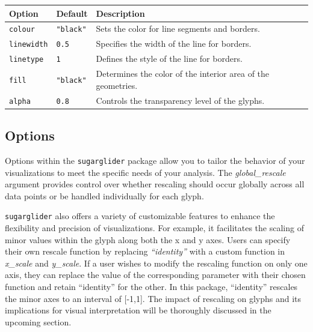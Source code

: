 \begin{longtable}[]{@{}
  >{\raggedright\arraybackslash}p{}
  >{\raggedright\arraybackslash}p{}
  >{\raggedright\arraybackslash}p{}@{}}
\toprule\noalign{}
\begin{minipage}[b]{\linewidth}\raggedright
Option
\end{minipage} & \begin{minipage}[b]{\linewidth}\raggedright
Default
\end{minipage} & \begin{minipage}[b]{\linewidth}\raggedright
Description
\end{minipage} \\
\midrule\noalign{}
\endhead
\bottomrule\noalign{}
\endlastfoot
\texttt{colour} & \texttt{"black"} & Sets the color for line segments and borders. \\
\texttt{linewidth} & \texttt{0.5} & Specifies the width of the line for borders. \\
\texttt{linetype} & \texttt{1} & Defines the style of the line for borders. \\
\texttt{fill} & \texttt{"black"} & Determines the color of the interior area of the geometries. \\
\texttt{alpha} & \texttt{0.8} & Controls the transparency level of the glyphs. \\
\end{longtable}

\subsection{Options}\label{options}

Options within the \texttt{sugarglider} package allow you to tailor the behavior of your visualizations to meet the specific needs of your analysis. The \emph{global\_rescale} argument provides control over whether rescaling should occur globally across all data points or be handled individually for each glyph.

\texttt{sugarglider} also offers a variety of customizable features to enhance the flexibility and precision of visualizations. For example, it facilitates the scaling of minor values within the glyph along both the x and y axes. Users can specify their own rescale function by replacing \emph{``identity''} with a custom function in \emph{x\_scale} and \emph{y\_scale}. If a user wishes to modify the rescaling function on only one axis, they can replace the value of the corresponding parameter with their chosen function and retain ``identity'' for the other. In this package, ``identity'' rescales the minor axes to an interval of {[}-1,1{]}. The impact of rescaling on glyphs and its implications for visual interpretation will be thoroughly discussed in the upcoming section.

